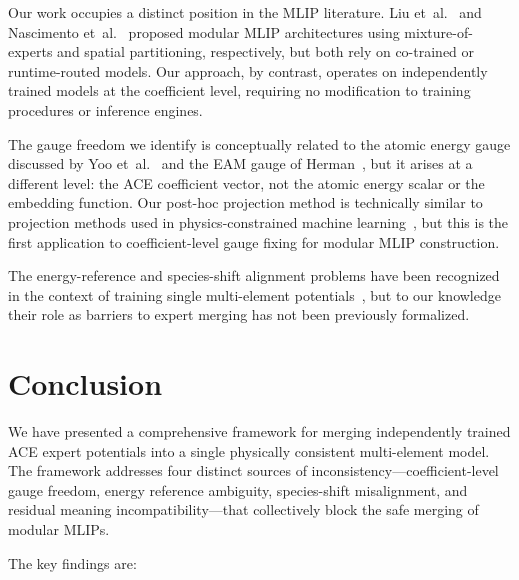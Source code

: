 \documentclass[twoside,prb,aps,floatfix,superscriptaddress,longbibliography]{revtex4-2}
\begin{document}
Our work occupies a distinct position in the MLIP literature. Liu et~al.~\cite{Liu2026ScalingMoE} and Nascimento et~al.~\cite{Nascimento2026MoEFramework} proposed modular MLIP architectures using mixture-of-experts and spatial partitioning, respectively, but both rely on co-trained or runtime-routed models. Our approach, by contrast, operates on independently trained models at the coefficient level, requiring no modification to training procedures or inference engines.

The gauge freedom we identify is conceptually related to the atomic energy gauge discussed by Yoo et~al.~\cite{Yoo2019AtomicEnergyMapping} and the EAM gauge of Herman~\cite{Herman2008EAMGauge}, but it arises at a different level: the ACE coefficient vector, not the atomic energy scalar or the embedding function. Our post-hoc projection method is technically similar to projection methods used in physics-constrained machine learning~\cite{PINNProj2024,KKThPINN2024}, but this is the first application to coefficient-level gauge fixing for modular MLIP construction.

The energy-reference and species-shift alignment problems have been recognized in the context of training single multi-element potentials~\cite{Tanaka2023Alignment}, but to our knowledge their role as barriers to expert merging has not been previously formalized.

\section{Conclusion}
\label{sec:conclusion}

We have presented a comprehensive framework for merging independently trained ACE expert potentials into a single physically consistent multi-element model. The framework addresses four distinct sources of inconsistency---coefficient-level gauge freedom, energy reference ambiguity, species-shift misalignment, and residual meaning incompatibility---that collectively block the safe merging of modular MLIPs.

The key findings are:
\end{document}
